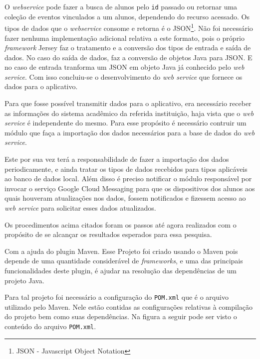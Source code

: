 		\par O \textit{webservice} pode fazer a busca de alunos pelo \texttt{id}
passado ou retornar uma coleção de eventos vinculados a um alunos, dependendo
do recurso acessado. Os tipos de dados que o \textit{webservice} consome e
retorna é o JSON\footnote{JSON - Javascript Object Notation}. Não foi
necessário fazer nenhuma implementação adicional relativa a este formato, pois
o próprio \textit{framework} Jersey faz o tratamento e a conversão dos tipos de
entrada e saída de dados. No caso do saída de dados, faz a conversão de objetos 
Java para JSON. E no caso de entrada tranforma um JSON em objeto
Java já conhecido pelo \textit{web service}. Com isso concluiu-se o
desenvolvimento do \textit{web service} que fornece os dados para o aplicativo.

	\par Para que fosse possível transmitir dados para o aplicativo, era
necessário receber as informações do sistema acadêmico da referida instituição,
haja vista que o \textit{web service} é independente do mesmo. Para esse
propósito é necessário  contruir um módulo que faça a importação dos dados
necessários para a base de dados do \textit{web service}. 

	\par Este por sua vez terá a responsabilidade de fazer a importação dos dados
periodicamente, e ainda tratar os tipos de dados recebidos para tipos
aplicáveis ao banco de dados local. Além disso é preciso notificar o módulo
responsável por invocar o serviço Google Cloud Messaging para que os
dispositivos dos alunos aos quais houveram atualizações nos dados, fossem
notificados e fizessem acesso ao \textit{web service} para solicitar esses
dados atualizados.

	\par Os procedimentos acima citados foram os passos até agora realizados com o
propósito de se alcançar os resultados esperados para essa pesquisa.



\par Com a ajuda do plugin Maven. Esse Projeto foi criado usando o
Maven pois depende de uma quantidade considerável de \textit{frameworks}, e uma das
principais funcionalidades deste plugin, é ajudar na resolução das dependências
de um projeto Java.

	\par Para tal projeto foi necessário a configuração do \texttt{POM.xml} que é o
arquivo utilizado pelo Maven. Nele estão contidas as configurações
relativas à compilação do projeto bem como suas dependências.  Na figura
 a seguir pode ser visto o conteúdo do arquivo
\texttt{POM.xml}.






